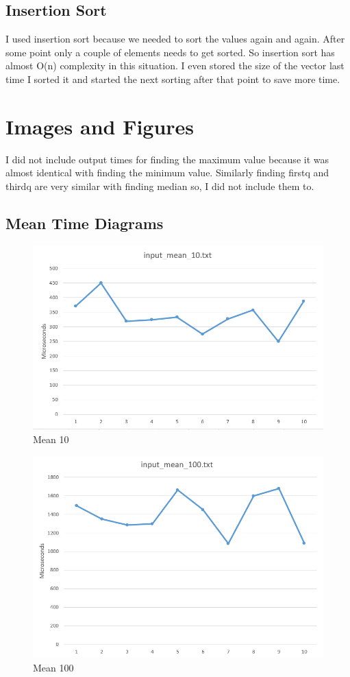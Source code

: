 \documentclass[a4paper, 12pt, titlepage]{article}
\begin{document}
\subsection{Insertion Sort}
\par
I used insertion sort because we needed to sort the values again and again. After some point only a couple of elements needs to get sorted. So insertion sort has almost O(n) complexity in this situation. I even stored the size of the vector last time I sorted it and started the next sorting after that point to save more time. 

\newpage

\vspace{150pt}



\newpage

\section{Images and Figures}
I did not include output times for finding the maximum value because it was almost identical with finding the minimum value. Similarly finding firstq and thirdq are very similar with finding median so, I did not include them to. 
\subsection{Mean Time Diagrams}
\begin{figure}[H]
	\centering
	\caption{Mean 10}
	\includegraphics[width=.75\textwidth]{mean10.png} %
\end{figure}

\begin{figure}[H]
	\centering
	\caption{Mean 100}
	\includegraphics[width=.75\textwidth]{mean100.png} %
\end{figure}
\end{document}
